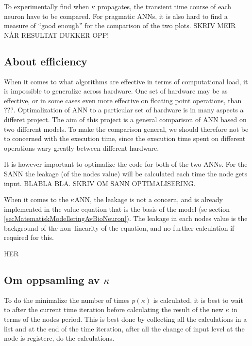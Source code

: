 	To experimentally find when $\kappa$ propagates, the transient time course of each neuron have to be compared.
	For pragmatic ANNs, it is also hard to find a measure of ``good enough'' for the comparison of the two plots. 
	SKRIV MEIR NÅR RESULTAT DUKKER OPP! %











\subsection{About efficiency}
When it comes to what algorithms are effective in terms of computational load, it is impossible to generalize across hardware.
One set of hardware may be as effective, or in some cases even more effective on floating point operations, than ???. %
Optimalization of ANN to a particular set of hardware is in many aspects a differet project. 
The aim of this project is a general comparison of ANN based on two different models.
To make the comparison general, we should therefore not be to concerned with the execution time, since the execution time spent on different operations wary greatly between different hardware.

It is however important to optimalize the code for both of the two ANNs. 
For the SANN the leakage (of the nodes value) will be calculated each time the node gets input.
BLABLA BLA. SKRIV OM SANN OPTIMALISERING.


When it comes to the $\kappa$ANN, the leakage is not a concern, and is already implemented in the value equation that is the basis of the model (se section \ref{secMatematiskModelleringAvBioNeuron}).
The leakage in each nodes value is the background of the non--linearity of the equation, and no further calculation if required for this.

\large{HER}

\subsection{Om oppsamling av $\kappa$}
To do the minimalize the number of times $p(\kappa)$ is calculated, it is best to wait to after the current time iteration before calculating the result of the new $\kappa$ in terms of the nodes period.
This is best done by collecting all the calculations in a list and at the end of the time iteration, after all the change of input level at the node is registere, do the calculations.


